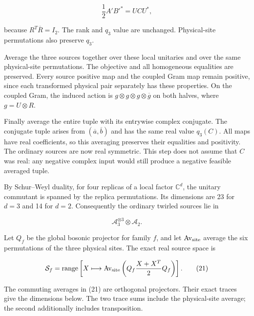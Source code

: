 \documentclass[
  11pt,
]{article}
\begin{document}
\[
\frac12A'B'^*=UCU^*,
\]

because \(R^T\overline R=I_2\). The rank and \(q_3\) value are
unchanged. Physical-site permutations also preserve \(q_3\).

Average the three sources together over these local unitaries and over
the same physical-site permutations. The objective and all homogeneous
equalities are preserved. Every source positive map and the coupled Gram
map remain positive, since each transformed physical pair separately has
these properties. On the coupled Gram, the induced action is
\(g\otimes g\otimes g\otimes\overline g\) on both halves, where
\(g=U\otimes R\).

Finally average the entire tuple with its entrywise complex conjugate.
The conjugate tuple arises from \((\overline a,\overline b)\) and has
the same real value \(q_3(C)\). All maps have real coefficients, so this
averaging preserves their equalities and positivity. The ordinary
sources are now real symmetric. This step does not assume that \(C\) was
real: any negative complex input would still produce a negative feasible
averaged tuple.

By Schur--Weyl duality, for four replicas of a local factor
\(\mathbb C^d\), the unitary commutant is spanned by the replica
permutations. Its dimensions are 23 for \(d=3\) and 14 for \(d=2\).
Consequently the ordinary twirled sources lie in

\[
\mathcal A_3^{\otimes3}\otimes\mathcal A_2.
\]

Let \(Q_f\) be the global bosonic projector for family \(f\), and let
\(\operatorname{Av}_{\rm site}\) average the six permutations of the
three physical sites. The exact real source space is

\[
\mathcal S_f=\operatorname{range}\left[
X\longmapsto\operatorname{Av}_{\rm site}
\left(Q_f\frac{X+X^T}{2}Q_f\right)\right].
\tag{21}
\]

The commuting averages in (21) are orthogonal projectors. Their exact
traces give the dimensions below. The two trace sums include the
physical-site average; the second additionally includes transposition.
\end{document}
